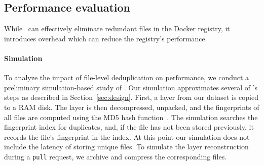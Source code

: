 \subsection{Performance evaluation}

While \sysname\ can effectively eliminate redundant files in the
Docker registry, it introduces overhead which can reduce the
registry's performance.
%



\paragraph{Simulation}
%
To analyze the impact of file-level deduplication on performance,
we conduct a preliminary simulation-based study of \sysname.
%
%
%
%
%
Our simulation
approximates several of \sysname's steps as described in Section~\ref{sec:design}.
%
First, a layer from our dataset is copied to a RAM disk. 
%
%
%
The layer is then decompressed, unpacked, and the fingerprints of all files
are computed using the MD5 hash function~\cite{MD5}.
%
The simulation searches the fingerprint index for duplicates,
and, if the file has not been stored previously, it records the
file's fingerprint in the index.
%
%
%
%
%
At this point our simulation does not include
the latency of storing unique files.
%
To simulate the layer reconstruction during a \texttt{pull} request,
we archive and compress the corresponding files.
%
%

